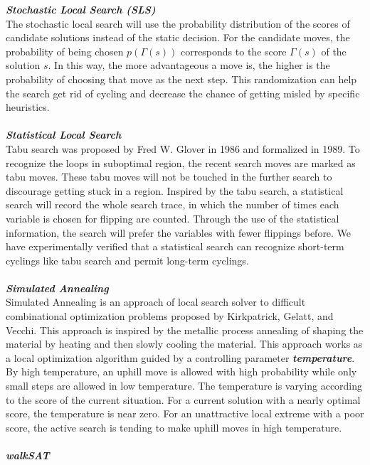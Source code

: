 \documentclass[12pt,a4paper,twoside]{scrartcl}
\numberwithin{equation}{section}
\begin{document}
\emph{\textbf{Stochastic Local Search (SLS)}}\\
The stochastic local search will use the probability distribution of the scores of candidate solutions instead of the static decision. For the candidate moves, the probability of being chosen $p(\Gamma(s))$ corresponds to the score $\Gamma(s)$ of the solution $s$. In this way, the more advantageous a move is, the higher is the probability of choosing that move as the next step. This randomization can help the search get rid of cycling and decrease the chance of getting misled by specific heuristics.\\
\\
\emph{\textbf{Statistical Local Search }}\\
 Tabu search was proposed by Fred W. Glover in 1986 and formalized in 1989\cite{glover1989tabu}. To recognize the loops in suboptimal region, the recent search moves are marked as tabu moves. These tabu moves will not be touched in the further search to discourage getting stuck in a region. Inspired by the tabu search, a statistical search will record the whole search trace, in which the number of times each variable is chosen for flipping are counted. Through the use of the statistical information, the search will prefer the variables with fewer flippings before. We have experimentally verified that a statistical search can recognize short-term cyclings like tabu search and permit long-term cyclings\cite{lisolving}.\\
\\
\emph{\textbf{Simulated Annealing}}\\
Simulated Annealing is an approach of local search solver to difficult combinational optimization problems proposed by Kirkpatrick, Gelatt, and Vecchi\cite{kirkpatrick1983optimization}. This approach is inspired by the metallic process annealing of shaping the material by heating and then slowly cooling the material. This approach works as a local optimization algorithm guided by a controlling parameter \emph{\textbf{temperature}}. By high temperature, an uphill move is allowed with high probability while only small steps are allowed in low temperature. The temperature is varying according to the score of the current situation.  For a current solution with a nearly optimal score, the temperature is near zero. For an unattractive local extreme with a poor score, the active search is tending to make uphill moves in high temperature.\\
\\
\emph{\textbf{walkSAT}}\\
\end{document}
